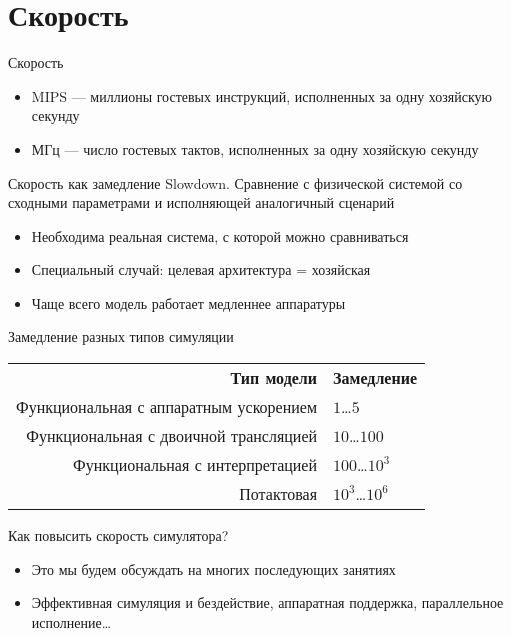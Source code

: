 \section{Скорость}

\begin{frame}{Скорость}
\begin{itemize}
\item MIPS — миллионы гостевых инструкций, исполненных за одну хозяйскую секунду
\item МГц — число гостевых тактов, исполненных за одну хозяйскую секунду
\end{itemize}
\end{frame}

\begin{frame}{Скорость как замедление}
Slowdown. Сравнение с физической системой со сходными параметрами и исполняющей аналогичный сценарий
\begin{itemize}
\item Необходима реальная система, с которой можно сравниваться
\item Специальный случай: целевая архитектура = хозяйская %
\item Чаще всего модель работает медленнее аппаратуры
\end{itemize}
\end{frame}

\begin{frame}{Замедление разных типов симуляции}
\begin{tabular}{rl}
\textbf{Тип модели}                    & \textbf{Замедление} \\
Функциональная с аппаратным ускорением & $1$\dots$5$ \\
Функциональная с двоичной трансляцией  & $10$\dots$100$ \\
Функциональная с интерпретацией        & $100$\dots$10^3$ \\
Потактовая                             & $10^3$\dots$10^6$ \\
\end{tabular}

\end{frame}


\begin{frame}{Как повысить скорость симулятора?}
\begin{itemize}
\item Это мы будем обсуждать на многих последующих занятиях
\item Эффективная симуляция и бездействие, аппаратная поддержка, параллельное исполнение\dots
\end{itemize}
\end{frame}

